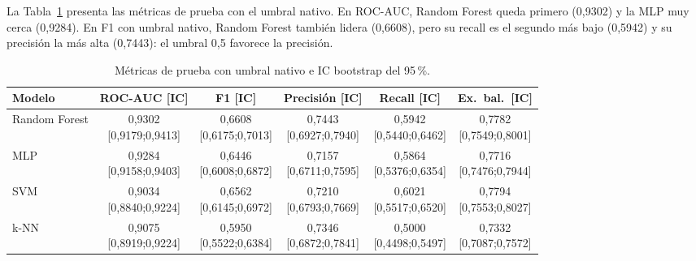 \documentclass[journal]{IEEEtran}
\begin{document}
La Tabla~\ref{tab:metricas-test} presenta las métricas de prueba con el umbral nativo. En
ROC-AUC, Random Forest queda primero (0{,}9302) y la MLP muy cerca (0{,}9284). En F1 con
umbral nativo, Random Forest también lidera (0{,}6608), pero su recall es el segundo más
bajo (0{,}5942) y su precisión la más alta (0{,}7443): el umbral 0,5 favorece la
precisión.

\begin{table}[t]
\centering
\caption{Métricas de prueba con umbral nativo e IC bootstrap del 95\,\%.}
\label{tab:metricas-test}
\scriptsize
\setlength{\tabcolsep}{3pt}
\begin{tabular}{lccccc}
\toprule
\textbf{Modelo} & \textbf{ROC-AUC [IC]} & \textbf{F1 [IC]} & \textbf{Precisión [IC]} & \textbf{Recall [IC]} & \textbf{Ex.\ bal.\ [IC]} \\
\midrule
Random Forest & \makecell{0{,}9302\\{[0{,}9179;0{,}9413]}} & \makecell{0{,}6608\\{[0{,}6175;0{,}7013]}} & \makecell{0{,}7443\\{[0{,}6927;0{,}7940]}} & \makecell{0{,}5942\\{[0{,}5440;0{,}6462]}} & \makecell{0{,}7782\\{[0{,}7549;0{,}8001]}} \\
MLP & \makecell{0{,}9284\\{[0{,}9158;0{,}9403]}} & \makecell{0{,}6446\\{[0{,}6008;0{,}6872]}} & \makecell{0{,}7157\\{[0{,}6711;0{,}7595]}} & \makecell{0{,}5864\\{[0{,}5376;0{,}6354]}} & \makecell{0{,}7716\\{[0{,}7476;0{,}7944]}} \\
SVM & \makecell{0{,}9034\\{[0{,}8840;0{,}9224]}} & \makecell{0{,}6562\\{[0{,}6145;0{,}6972]}} & \makecell{0{,}7210\\{[0{,}6793;0{,}7669]}} & \makecell{0{,}6021\\{[0{,}5517;0{,}6520]}} & \makecell{0{,}7794\\{[0{,}7553;0{,}8027]}} \\
k-NN & \makecell{0{,}9075\\{[0{,}8919;0{,}9224]}} & \makecell{0{,}5950\\{[0{,}5522;0{,}6384]}} & \makecell{0{,}7346\\{[0{,}6872;0{,}7841]}} & \makecell{0{,}5000\\{[0{,}4498;0{,}5497]}} & \makecell{0{,}7332\\{[0{,}7087;0{,}7572]}} \\

\end{tabular}
\end{table}
\end{document}
